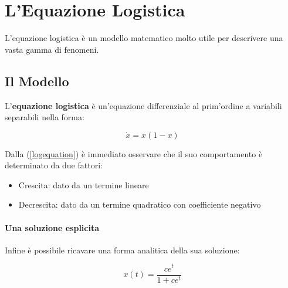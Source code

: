 \section{L'Equazione Logistica}

L'equazione logistica è un modello matematico molto utile per descrivere una vasta gamma di fenomeni.

\subsection{Il Modello}

L'\textbf{equazione logistica} è un'equazione differenziale al prim'ordine a variabili separabili nella forma: 

\begin{equation}
	\dot{x}=x(1-x)
	\label{logequation}
\end{equation}

Dalla (\ref{logequation}) è immediato osservare che il suo comportamento è determinato da due fattori:

\begin{itemize}
	\item Crescita: dato da un termine lineare \\
	\item Decrescita: dato da un termine quadratico con coefficiente negativo \\
\end{itemize}

\paragraph{Una soluzione esplicita}

Infine è possibile ricavare una forma analitica della sua soluzione:

\begin{equation}
	x(t)=\frac{ce^t}{1+ce^t}
	\label{logfunction}
\end{equation}

\begin{center}
\end{center}